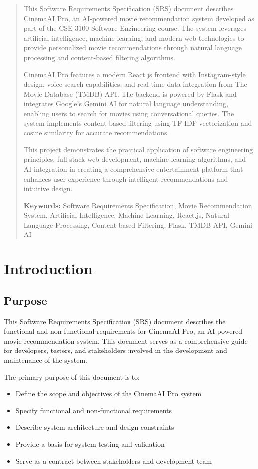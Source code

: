 \documentclass[12pt,a4paper]{article}
\begin{document}
\begin{abstract}
This Software Requirements Specification (SRS) document describes CinemaAI Pro, an AI-powered movie recommendation system developed as part of the CSE 3100 Software Engineering course. The system leverages artificial intelligence, machine learning, and modern web technologies to provide personalized movie recommendations through natural language processing and content-based filtering algorithms.

CinemaAI Pro features a modern React.js frontend with Instagram-style design, voice search capabilities, and real-time data integration from The Movie Database (TMDB) API. The backend is powered by Flask and integrates Google's Gemini AI for natural language understanding, enabling users to search for movies using conversational queries. The system implements content-based filtering using TF-IDF vectorization and cosine similarity for accurate recommendations.

This project demonstrates the practical application of software engineering principles, full-stack web development, machine learning algorithms, and AI integration in creating a comprehensive entertainment platform that enhances user experience through intelligent recommendations and intuitive design.

\textbf{Keywords:} Software Requirements Specification, Movie Recommendation System, Artificial Intelligence, Machine Learning, React.js, Natural Language Processing, Content-based Filtering, Flask, TMDB API, Gemini AI
\end{abstract}

\newpage

\section{Introduction}

\subsection{Purpose}
This Software Requirements Specification (SRS) document describes the functional and non-functional requirements for CinemaAI Pro, an AI-powered movie recommendation system. This document serves as a comprehensive guide for developers, testers, and stakeholders involved in the development and maintenance of the system.

The primary purpose of this document is to:
\begin{itemize}
    \item Define the scope and objectives of the CinemaAI Pro system
    \item Specify functional and non-functional requirements
    \item Describe system architecture and design constraints
    \item Provide a basis for system testing and validation
    \item Serve as a contract between stakeholders and development team
\end{itemize}
\end{document}
